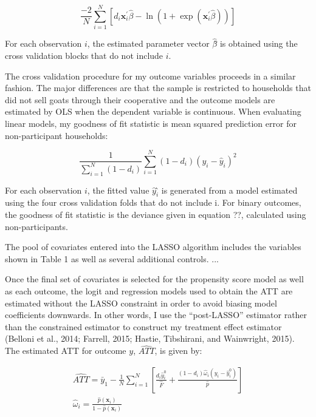 \documentclass[11pt]{article}
\begin{document}
\begin{equation}
\frac{-2}{N} \sum_{i=1}^{N}\left[d_{i} \mathbf{x}_{i}^{\prime} \hat{\beta}-\ln \left(1+\exp \left(\mathbf{x}_{i}^{\prime} \hat{\beta}\right)\right)\right]
\end{equation}

For each observation $i$, the estimated parameter vector $\hat{\beta}$̂ is obtained using the cross validation blocks that do not include $i$.

The cross validation procedure for my outcome variables proceeds in a similar fashion. The major differences are that the sample is restricted to households that did not sell goats through their cooperative and the outcome models are estimated by OLS when the dependent variable is continuous. When evaluating linear models, my goodness of fit statistic is mean squared prediction error for non-participant households:

\begin{equation}
\frac{1}{\sum_{i=1}^{N}\left(1-d_{i}\right)} \sum_{i=1}^{N}\left(1-d_{i}\right)\left(y_{i}-\hat{y}_{i}\right)^{2}
\end{equation}

For each observation $i$, the fitted value $\hat{y}_{i}$̂ is generated from a model estimated using the four cross validation folds that do not include i. For binary outcomes, the goodness of fit statistic is the deviance given in equation ??, calculated using non-participants.

The pool of covariates entered into the LASSO algorithm includes the variables shown in Table 1 as well as several additional controls. ...

Once the final set of covariates is selected for the propensity score model as well as each outcome, the logit and regression models used to obtain the ATT are estimated without the LASSO constraint in order to avoid biasing model coefficients downwards. In other words, I use the “post-LASSO” estimator rather than the constrained estimator to construct my treatment effect estimator (Belloni et al., 2014; Farrell, 2015; Hastie, Tibshirani, and Wainwright, 2015). The estimated ATT for outcome $y$, $\widehat{ATT}$, is given by:

\begin{equation}
\begin{array}{l}
 \widehat{ATT} =\bar{y}_{1}-\frac{1}{N} \sum_{i=1}^{N}\left[\frac{d_{i} \hat{y}_{i}^{0}}{\hat{F}}+\frac{\left(1-d_{i}\right) \hat{\omega}_{i}\left(y_{i}-\hat{y}_{i}^{0}\right)}{\hat{p}}\right] \\
\hat{\omega}_{i}=\frac{\hat{p}\left(\mathbf{x}_{i}\right)}{1-\hat{p}\left(\mathbf{x}_{i}\right)}
\end{array}
\end{equation}
\end{document}
